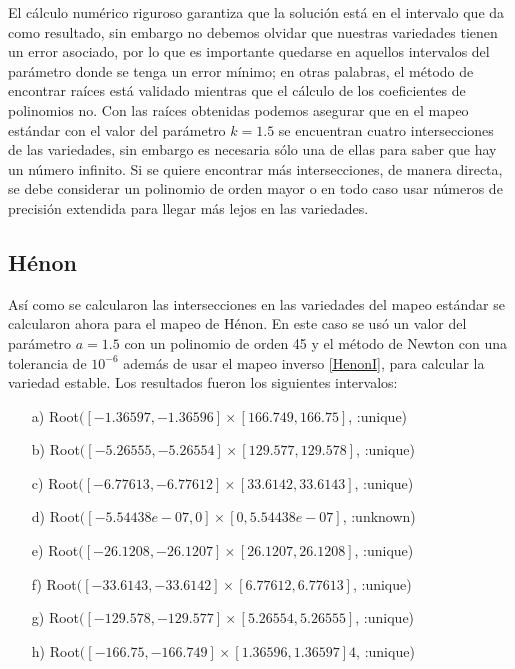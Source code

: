 El cálculo numérico riguroso garantiza que la solución está en el intervalo que da como resultado, sin embargo no debemos olvidar que nuestras variedades tienen un error asociado, por lo que es importante quedarse en aquellos intervalos del parámetro donde se tenga un error mínimo; en otras palabras, el método de encontrar raíces está validado mientras que el cálculo de los coeficientes de polinomios no. Con las raíces obtenidas podemos asegurar que en el mapeo estándar con el valor del parámetro $k=1.5$ se encuentran cuatro intersecciones de las variedades, sin embargo es necesaria sólo una de ellas para saber que hay un número infinito\citep{Ott}. Si se quiere encontrar más intersecciones, de manera directa, se debe considerar un polinomio de orden mayor o en todo caso usar números de precisión extendida para llegar más lejos en las variedades. 



\subsection{Hénon}
Así como se calcularon las intersecciones en las variedades del mapeo estándar se calcularon ahora para el mapeo de Hénon. En este caso se usó un valor del parámetro $a=1.5$ con un polinomio de orden 45 y el método de Newton con una tolerancia de $10^{-6}$ además de usar el mapeo inverso \eqref{HenonI}, para calcular la variedad estable. Los resultados fueron los siguientes intervalos:
\begin{itemize}
\item[a)] Root$([-1.36597, -1.36596] \times [166.749, 166.75]$, :unique)
\item[b)] Root$([-5.26555, -5.26554] \times [129.577, 129.578]$, :unique)
\item[c)] Root$([-6.77613, -6.77612] \times [33.6142, 33.6143]$, :unique)
\item[d)] Root$([-5.54438e-07, 0] \times [0, 5.54438e-07]$, :unknown)     
\item[e)] Root$([-26.1208, -26.1207] \times [26.1207, 26.1208]$, :unique)  
\item[f)] Root$([-33.6143, -33.6142] \times [6.77612, 6.77613]$, :unique)  
\item[g)] Root$([-129.578, -129.577] \times [5.26554, 5.26555]$, :unique) 
\item[h)] Root$([-166.75, -166.749] \times [1.36596, 1.36597]4$, :unique)
\end{itemize}

